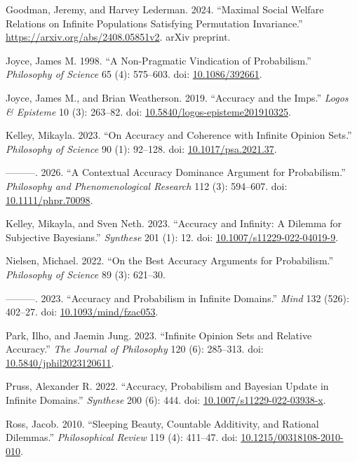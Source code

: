 \documentclass[
  11pt,
  letterpaper,
  DIV=11,
  numbers=noendperiod,
  twoside]{scrartcl}
\newlength{\cslhangindent}
\newenvironment{CSLReferences}[2] %
 {\begin{list}{}{%
  \setlength{\itemindent}{0pt}
  \setlength{\leftmargin}{0pt}
  \setlength{\parsep}{0pt}
  \ifodd #1
   \setlength{\leftmargin}{\cslhangindent}
   \setlength{\itemindent}{-1\cslhangindent}
  \fi
  \setlength{\itemsep}{#2\baselineskip}}}
 {\end{list}}
\theoremstyle{definition}
\theoremstyle{plain}
\theoremstyle{plain}
\theoremstyle{remark}
\begin{document}
\protect{}\label{refs}
\begin{CSLReferences}{1}{0}
Goodman, Jeremy, and Harvey Lederman. 2024. {``Maximal Social Welfare
Relations on Infinite Populations Satisfying Permutation Invariance.''}
\url{https://arxiv.org/abs/2408.05851v2}. arXiv preprint.

Joyce, James M. 1998. {``A Non-Pragmatic Vindication of Probabilism.''}
\emph{Philosophy of Science} 65 (4): 575--603. doi:
\href{https://doi.org/10.1086/392661}{10.1086/392661}.

Joyce, James M., and Brian Weatherson. 2019. {``Accuracy and the
Imps.''} \emph{Logos \& Episteme} 10 (3): 263--82. doi:
\href{https://doi.org/10.5840/logos-episteme201910325}{10.5840/logos-episteme201910325}.

Kelley, Mikayla. 2023. {``On Accuracy and Coherence with Infinite
Opinion Sets.''} \emph{Philosophy of Science} 90 (1): 92--128. doi:
\href{https://doi.org/10.1017/psa.2021.37}{10.1017/psa.2021.37}.

---------. 2026. {``A Contextual Accuracy Dominance Argument for
Probabilism.''} \emph{Philosophy and Phenomenological Research} 112 (3):
594--607. doi:
\href{https://doi.org/10.1111/phpr.70098}{10.1111/phpr.70098}.

Kelley, Mikayla, and Sven Neth. 2023. {``Accuracy and Infinity: A
Dilemma for Subjective {Bayesians}.''} \emph{Synthese} 201 (1): 12. doi:
\href{https://doi.org/10.1007/s11229-022-04019-9}{10.1007/s11229-022-04019-9}.

Nielsen, Michael. 2022. {``On the Best Accuracy Arguments for
Probabilism.''} \emph{Philosophy of Science} 89 (3): 621--30.

---------. 2023. {``Accuracy and Probabilism in Infinite Domains.''}
\emph{Mind} 132 (526): 402--27. doi:
\href{https://doi.org/10.1093/mind/fzac053}{10.1093/mind/fzac053}.

Park, Ilho, and Jaemin Jung. 2023. {``Infinite Opinion Sets and Relative
Accuracy.''} \emph{The Journal of Philosophy} 120 (6): 285--313. doi:
\href{https://doi.org/10.5840/jphil2023120611}{10.5840/jphil2023120611}.

Pruss, Alexander R. 2022. {``Accuracy, Probabilism and {Bayesian} Update
in Infinite Domains.''} \emph{Synthese} 200 (6): 444. doi:
\href{https://doi.org/10.1007/s11229-022-03938-x}{10.1007/s11229-022-03938-x}.

Ross, Jacob. 2010. {``Sleeping Beauty, Countable Additivity, and
Rational Dilemmas.''} \emph{Philosophical Review} 119 (4): 411--47. doi:
\href{https://doi.org/10.1215/00318108-2010-010}{10.1215/00318108-2010-010}.

\end{CSLReferences}
\end{document}
